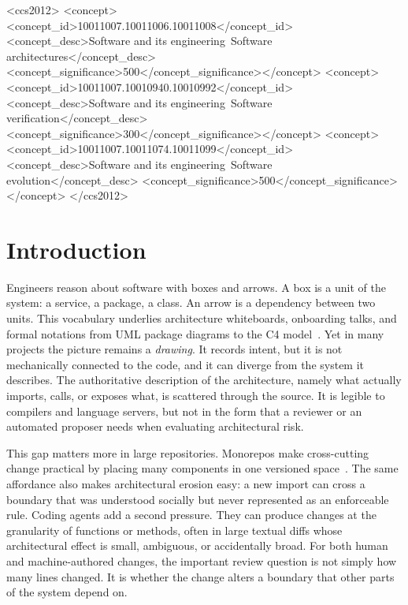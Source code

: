 \documentclass[sigconf,review,anonymous]{acmart}
\theoremstyle{plain}
\theoremstyle{definition}
\begin{document}
\begin{CCSXML}
<ccs2012>
<concept><concept_id>10011007.10011006.10011008</concept_id>
<concept_desc>Software and its engineering~Software architectures</concept_desc>
<concept_significance>500</concept_significance></concept>
<concept><concept_id>10011007.10010940.10010992</concept_id>
<concept_desc>Software and its engineering~Software verification</concept_desc>
<concept_significance>300</concept_significance></concept>
<concept><concept_id>10011007.10011074.10011099</concept_id>
<concept_desc>Software and its engineering~Software evolution</concept_desc>
<concept_significance>500</concept_significance></concept>
</ccs2012>
\end{CCSXML}


\maketitle

\section{Introduction}

Engineers reason about software with boxes and arrows. A box is a unit of the
system: a service, a package, a class. An arrow is a dependency between two
units. This vocabulary underlies architecture whiteboards, onboarding talks, and
formal notations from UML package diagrams to the C4 model~\cite{c4model}. Yet
in many projects the picture remains a \emph{drawing}. It records intent, but it
is not mechanically connected to the code, and it can diverge from the system it
describes. The authoritative description of the architecture, namely what
actually imports, calls, or exposes what, is scattered through the source. It is
legible to compilers and language servers, but not in the form that a reviewer
or an automated proposer needs when evaluating architectural risk.

This gap matters more in large repositories. Monorepos make cross-cutting change
practical by placing many components in one versioned
space~\cite{potvin2016google,jaspan2018advantages}. The same affordance also
makes architectural erosion easy: a new import can cross a boundary that was
understood socially but never represented as an enforceable rule. Coding agents
add a second pressure. They can produce changes at the granularity of functions
or methods, often in large textual diffs whose architectural effect is small,
ambiguous, or accidentally broad. For both human and machine-authored changes,
the important review question is not simply how many lines changed. It is
whether the change alters a boundary that other parts of the system depend on.
\end{document}
